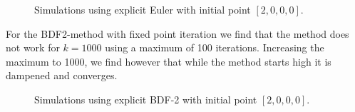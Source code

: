 \documentclass{article}
\begin{document}
\begin{figure}[H]
\centering
{}\hfill
{}\hfill
\caption{Simulations using explicit Euler with initial point \(\left[2,0,0,0\right]\).} \label{Fig3_1}
\end{figure}

For the BDF2-method with fixed point iteration we find that the method does not work for \(k=1000\) using a maximum of 100 iterations. Increasing the maximum to 1000, we find however that while the method starts high it is dampened and converges.

\begin{figure}[H]
\centering
{}\hfill
{}\hfill
\caption{Simulations using explicit BDF-2 with initial point \(\left[2,0,0,0\right]\).} \label{Fig3_2}
\end{figure}
\end{document}

